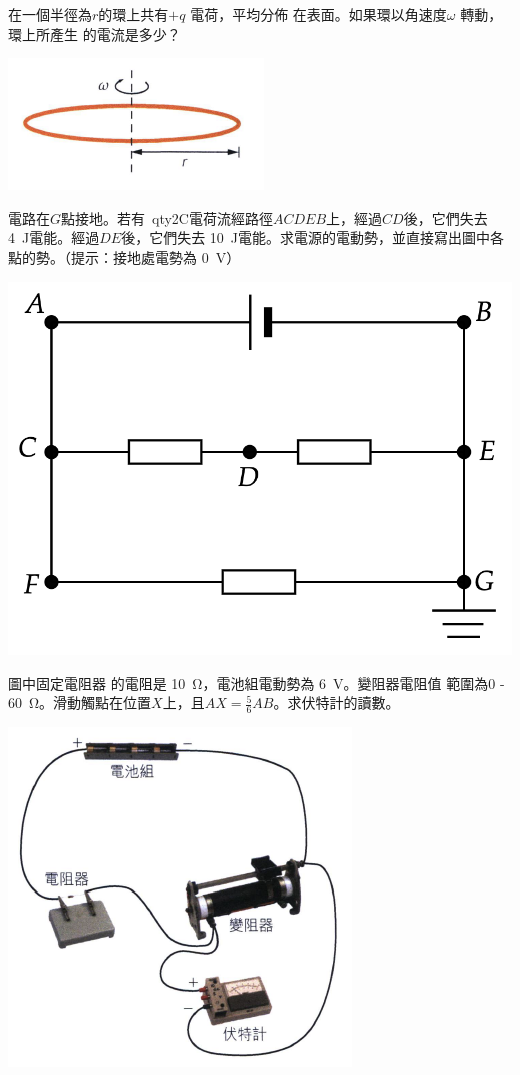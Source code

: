{
    在一個半徑為$r$的環上共有$+q$ 電荷，平均分佈 在表面。如果環以角速度$\omega$ 轉動，環上所產生 的電流是多少？
    \par{\par\centering\includegraphics[width=.35\textwidth]{./img/ch2_circuit_lq_2024-06-14-14-33-19.png}\par}

}{}
{
    電路在$G$點接地。若有\ qty{2}{C}電荷流經路徑$ACDEB$上，經過$CD$後，它們失去 \qty{4}{J}電能。經過$DE$後，它們失去 \qty{10}{J}電能。求電源的電動勢，並直接寫出圖中各點的勢。（提示：接地處電勢為 \qty{0}{V}）\par{}
    \par{\par\centering\includegraphics[width=.4\textwidth]{./img/ch2_circuit_lq_2024-06-14-13-59-11.png}\par}
}{

}

{
    圖中固定電阻器 的電阻是 \qty{10}{\ohm}，電池組電動勢為 \qty{6}{V}。變阻器電阻值 範圍為0 - \qty{60}{\ohm}。滑動觸點在位置$X$上，且$AX=\frac{5}{6}AB$。求伏特計的讀數。
    \par{\par\centering\includegraphics[width=.35\textwidth]{./img/ch2_circuit_lq_2024-06-14-14-10-27.png}\par}
}{

}


